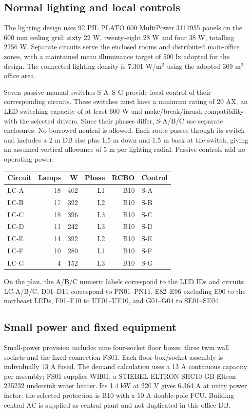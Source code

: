 {\fontsize{12}{14}\selectfont\tenantselection}
\subsection*{Normal lighting and local controls}
The lighting design uses 92 PIL PLATO 600 MultiPower 3117955 panels on the 600 mm ceiling grid: sixty 22 W, twenty-eight 28 W and four 38 W, totalling 2256 W. Separate circuits serve the enclosed rooms and distributed main-office zones, with a maintained mean illuminance target of 500 lx adopted for the design. The connected lighting density is 7.301 W/m$^2$ using the adopted 309 m$^2$ office area.

Seven passive manual switches S-A--S-G provide local control of their corresponding circuits. These switches must have a minimum rating of 20 AX, an LED switching capacity of at least 600 W and make/break/inrush compatibility with the selected drivers. Since their phases differ, S-A/B/C use separate enclosures. No borrowed neutral is allowed. Each route passes through its switch and includes a 2 m DB rise plus 1.5 m down and 1.5 m back at the switch, giving an assumed vertical allowance of 5 m per lighting radial. Passive controls add no operating power.
\begin{center}\begin{tabular}{lrrrrl}\toprule
Circuit & Lamps & W & Phase & RCBO & Control\\\midrule

LC-A & 18 & 402 & L1 & B10 & S-A \\
LC-B & 17 & 392 & L2 & B10 & S-B \\
LC-C & 18 & 396 & L3 & B10 & S-C \\
LC-D & 11 & 242 & L3 & B10 & S-D \\
LC-E & 14 & 392 & L2 & B10 & S-E \\
LC-F & 10 & 280 & L1 & B10 & S-F \\
LC-G & 4 & 152 & L3 & B10 & S-G \\

\bottomrule\end{tabular}\end{center}
On the plan, the A/B/C numeric labels correspond to the LED IDs and circuits LC-A/B/C. D01--D11 correspond to PN01--PN11, E82--E96 excluding E90 to the northeast LEDs, F01--F10 to UE01--UE10, and G01--G04 to SE01--SE04.

\subsection*{Small power and fixed equipment}
Small-power provision includes nine four-socket floor boxes, three twin wall sockets and the fixed connection FS01. Each floor-box/socket assembly is individually 13 A fused. The demand calculation uses a 13 A continuous capacity per assembly; FS01 supplies WH01, a STIEBEL ELTRON SHC10 GB Eltron 235232 undersink water heater. Its 1.4 kW at 220 V gives 6.364 A at unity power factor; the selected protection is B10 with a 10 A double-pole FCU. Building central AC is supplied as central plant and not duplicated in this office DB.

